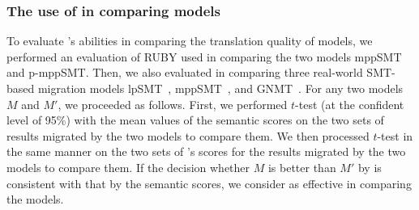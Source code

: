 \subsubsection{The use of {\model} in comparing models}
To evaluate {\model}'s abilities in comparing the translation quality
of models, we performed an evaluation of RUBY used in comparing
the two models mppSMT and p-mppSMT.
%
Then, we also evaluated {\model} in comparing three real-world
SMT-based migration models lpSMT~\cite{fse13}, mppSMT~\cite{ase15},
and GNMT~\cite{gnmt}.  
%
For any two models $M$ and $M'$, we proceeded as follows. First, we
performed $t$-test (at the confident level of 95\%) with the mean
values of the semantic scores on the two sets of results migrated by
the two models to compare them. We then processed $t$-test in the same
manner on the two sets of {\model}'s scores for the results migrated
by the two models to compare them. If the decision whether $M$ is
better than $M'$ by {\model} is consistent with that by the semantic
scores, we consider {\model} as effective in comparing the models.



